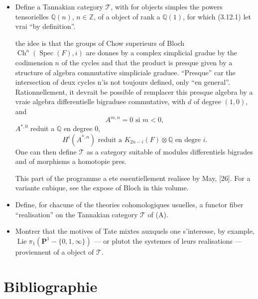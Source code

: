 \documentclass[11pt,a4paper]{article}
\theoremstyle{plain}
\theoremstyle{definition}
\DeclareMathOperator{\Spec}{Spec}
\DeclareMathOperator{\Ch}{Ch}
\DeclareMathOperator{\Lie}{Lie}
\newcommand{\Q}{\mathbb{Q}}
\newcommand{\Z}{\mathbb{Z}}
\begin{document}
\begin{itemize}
\item[(A)] Define a Tannakian category $\mathcal{T}$, with for objects simples the powers tensorielles $\Q(n)$, $n \in \Z$, of a object of rank a $\Q(1)$, for which (3.12.1) let vrai ``by definition''.

the idee is that the groups of Chow superieurs of Bloch $\Ch^n(\Spec(F), i)$ are donnes by a complex simplicial gradue by the codimension $n$ of the cycles and that the product is presque given by a structure of algebra commutative simpliciale graduee. ``Presque'' car the intersection of deux cycles n'is not toujours defined, only ``en general''. Rationnellement, it devrait be possible of remplacer this presque algebra by a vraie algebra differentielle bigraduee commutative, with $d$ of degree $(1, 0)$, and
$$
A^{m,n} = 0 \text{ si } m < 0,
$$
$A^{*,0}$ reduit a $\Q$ en degree $0$,
$$
H^i(A^{*,n}) \text{ reduit a } K_{2n-i}(F) \otimes \Q \text{ en degre } i.
$$
One can then define $\mathcal{T}$ as a category suitable of modules differentiels bigrades and of morphisms a homotopie pres.

This part of the programme a ete essentiellement realisee by May, [26]. For a variante cubique, see the expose of Bloch in this volume.

\item[(B)] Define, for chacune of the theories cohomologiques usuelles, a functor fiber ``realisation'' on the Tannakian category $\mathcal{T}$ of (A).

\item[(C)] Montrer that the motives of Tate mixtes auxquels one s'interesse, by example, $\Lie \pi_1(\mathbf{P}^1 - \{0, 1, \infty\})$ --- or plutot the systemes of leurs realisations --- proviennent of a object of $\mathcal{T}$.
\end{itemize}


\section*{Bibliographie}
\end{document}
